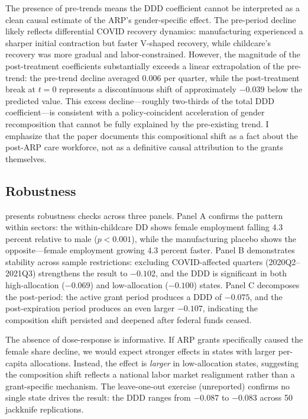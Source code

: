 \documentclass[12pt]{article}
\begin{document}
The presence of pre-trends means the DDD coefficient cannot be interpreted as a clean causal estimate of the ARP's gender-specific effect. The pre-period decline likely reflects differential COVID recovery dynamics: manufacturing experienced a sharper initial contraction but faster V-shaped recovery, while childcare's recovery was more gradual and labor-constrained. However, the magnitude of the post-treatment coefficients substantially exceeds a linear extrapolation of the pre-trend: the pre-trend decline averaged 0.006 per quarter, while the post-treatment break at $t = 0$ represents a discontinuous shift of approximately $-0.039$ below the predicted value. This excess decline---roughly two-thirds of the total DDD coefficient---is consistent with a policy-coincident acceleration of gender recomposition that cannot be fully explained by the pre-existing trend. I emphasize that the paper documents this compositional shift as a fact about the post-ARP care workforce, not as a definitive causal attribution to the grants themselves.

\subsection{Robustness}



 presents robustness checks across three panels. Panel A confirms the pattern within sectors: the within-childcare DD shows female employment falling 4.3 percent relative to male ($p < 0.001$), while the manufacturing placebo shows the opposite---female employment growing 4.3 percent faster. Panel B demonstrates stability across sample restrictions: excluding COVID-affected quarters (2020Q2--2021Q3) strengthens the result to $-0.102$, and the DDD is significant in both high-allocation ($-0.069$) and low-allocation ($-0.100$) states. Panel C decomposes the post-period: the active grant period produces a DDD of $-0.075$, and the post-expiration period produces an even larger $-0.107$, indicating the composition shift persisted and deepened after federal funds ceased.

The absence of dose-response is informative. If ARP grants specifically caused the female share decline, we would expect stronger effects in states with larger per-capita allocations. Instead, the effect is \emph{larger} in low-allocation states, suggesting the composition shift reflects a national labor market realignment rather than a grant-specific mechanism. The leave-one-out exercise (unreported) confirms no single state drives the result: the DDD ranges from $-0.087$ to $-0.083$ across 50 jackknife replications.
\end{document}
